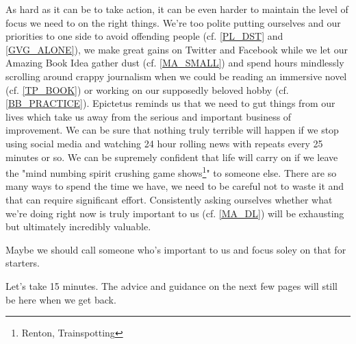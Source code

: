 \cleardoublepage

As hard as it can be to take action, it can be even harder to maintain the level of focus we need to on the right things. We're too polite putting ourselves and our priorities to one side to avoid offending people (cf. \ref{PL_DST} and \ref{GVG_ALONE}), we make great gains on Twitter and Facebook while we let our Amazing Book Idea gather dust (cf. \ref{MA_SMALL}) and spend hours mindlessly scrolling around crappy journalism when we could be reading an immersive novel (cf. \ref{TP_BOOK}) or working on our supposedly beloved hobby (cf. \ref{BB_PRACTICE}). 
Epictetus reminds us that we need to gut things from our lives which take us away from the serious and important business of improvement. We can be sure that nothing truly terrible will happen if we stop using social media and watching 24 hour rolling news with repeats every 25 minutes or so. We can be supremely confident that life will carry on if we leave the "mind numbing spirit crushing game shows\footnote{Renton, Trainspotting}" to someone else. There are so many ways to spend the time we have, we need to be careful not to waste it and that can require significant effort. Consistently asking ourselves whether what we're doing right now is truly important to us (cf. \ref{MA_DL}) will be exhausting but ultimately incredibly valuable.

Maybe we should call someone who's important to us and focus soley on that for starters. 

Let's take 15 minutes. The advice and guidance on the next few pages will still be here when we get back. 

\clearpage
